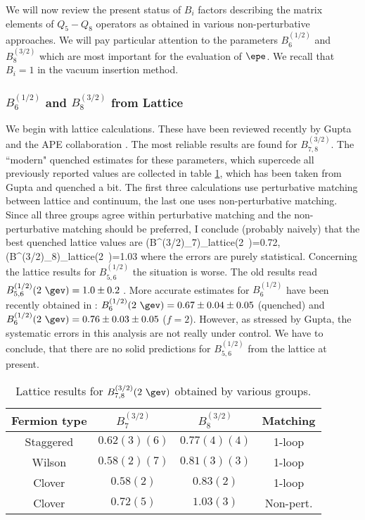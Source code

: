 We will now review the present status of $B_i$ factors describing
the matrix elements of $Q_5-Q_8$ operators as obtained in various
non-perturbative approaches. We will pay particular attention to
the parameters $B^{(1/2)}_{6}$ and $B^{(3/2)}_{8}$ which are most
important for the evaluation of $\epe$. We recall that $B_i=1$
in the vacuum insertion method.

\subsubsection{$B^{(1/2)}_{6}$ and $B^{(3/2)}_{8}$ from Lattice}
We begin with lattice calculations. These have been reviewed
recently by Gupta \cite{GUPTA98} and the APE collaboration \cite{APE}. 
The most reliable
results are found for $B^{(3/2)}_{7,8}$. The ``modern" quenched
estimates for these parameters, which supercede all previously
reported values are collected in table \ref{tab:317}, which has been
taken from Gupta and quenched a bit. The first three calculations
use perturbative matching between lattice and continuum, the last
one uses non-perturbative matching. Since all three groups agree
within perturbative matching and the non-perturbative matching
should be preferred, I conclude (probably naively) that the best
quenched lattice values are
\be\label{LAT}
(B^{(3/2)}_{7})_{\rm lattice}(2~\gev)=0.72,
\quad\quad
(B^{(3/2)}_{8})_{\rm lattice}(2~\gev)=1.03
\ee
where the errors are purely statistical. Concerning the
lattice results for $B^{(1/2)}_{5,6}$ the situation is
 worse. The old results read
$B^{(1/2)}_{5,6}(2~\gev)=1.0 \pm 0.2$ \cite{kilcup:91,sharpe:91}.
More accurate estimates for $B^{(1/2)}_{6}$ have been recently
obtained in \cite{kilcup:98}: 
$B^{(1/2)}_{6}(2~\gev)=0.67 \pm 0.04\pm 0.05$
(quenched) and $B^{(1/2)}_{6}(2~\gev)=0.76 \pm 0.03\pm0.05$
($f=2$). However, as stressed by Gupta, the systematic
errors in this analysis are not really under control.
We have to conclude, that there are no solid predictions for
$B^{(1/2)}_{5,6}$ from the lattice at present.
\begin{table}[thb]
\caption[]{ Lattice results for $B^{(3/2)}_{7,8} (2~\gev)$ obtained
by various groups. 
\label{tab:317}}
\begin{center}
\begin{tabular}{|c|c|c|c|}\hline
  { Fermion type}& $B^{(3/2)}_7$& $B^{(3/2)}_8$ & Matching \\
 \hline
Staggered\cite{GKS}& $0.62(3)(6)$ &$0.77(4)(4)$ & 1-loop \\
Wilson\cite{G67}& $0.58(2)(7)$ &$0.81(3)(3)$ & 1-loop \\
Clover\cite{APE}& $0.58(2)$ &$0.83(2)$ & 1-loop \\
Clover\cite{APE}& $0.72(5)$ &$1.03(3)$ &  Non-pert. \\
\hline
\end{tabular}
\end{center}
\end{table}
